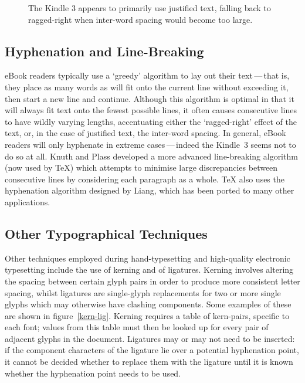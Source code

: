 \documentclass{sig-alternate}
\begin{document}
\begin{figure}
	\centering
	\caption{The Kindle 3 appears to primarily use justified text, falling back to ragged-right when inter-word spacing would become too large.}\vspace{-6pt}
	\label{kindle}
\end{figure}

\subsection{Hyphenation and Line-Breaking}
eBook readers typically use a `greedy' algorithm to lay out their text\,---\,that is, they place as many words as will fit onto the current line without exceeding it, then start a new line and continue. Although this algorithm is optimal in that it will always fit text onto the fewest possible lines, it often causes consecutive lines to have wildly varying lengths, accentuating either the `ragged-right' effect of the text, or, in the case of justified text, the inter-word spacing. In general, eBook readers will only hyphenate in extreme cases\,---\,indeed the Kindle~3 seems not to do so at all. Knuth and Plass\cite{Knuth1981} developed a more advanced line-breaking algorithm (now used by \TeX{}) which attempts to minimise large discrepancies between consecutive lines by considering each paragraph as a whole. \TeX{} also uses the hyphenation algorithm designed by Liang\cite{Liang1983}, which has been ported to many other applications.

\subsection{Other Typographical Techniques}
Other techniques employed during hand-type\-set\-t\-ing and high-qua\-l\-ity electronic typesetting include the use of kerning and of ligatures. Kerning involves altering the spacing between certain glyph pairs in order to produce more consistent letter spacing, whilst ligatures are sin\-gle-glyph replacements for two or more single glyphs which may otherwise have clashing components. Some examples of these are shown in figure~\ref{kern-lig}.
Kerning requires a table of kern-pairs, specific to each font; values from this table must then be looked up for every pair of adjacent glyphs in the document. Ligatures may or may not need to be inserted: if the component characters of the ligature lie over a potential hyphenation point, it cannot be decided whether to replace them with the ligature until it is known whether the hyphenation point needs to be used.
\end{document}
